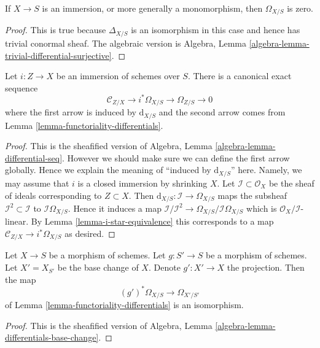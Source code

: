\begin{lemma}
\label{lemma-immersion-differentials}
If $X \to S$ is an immersion, or more generally a monomorphism, then
$\Omega_{X/S}$ is zero.
\end{lemma}

\begin{proof}
This is true because $\Delta_{X/S}$ is an isomorphism in this case
and hence has trivial conormal sheaf. The algebraic version is
Algebra, Lemma \ref{algebra-lemma-trivial-differential-surjective}.
\end{proof}

\begin{lemma}
\label{lemma-differentials-relative-immersion}
Let $i : Z \to X$ be an immersion of schemes over $S$.
There is a canonical exact sequence
$$
\mathcal{C}_{Z/X} \to i^*\Omega_{X/S} \to \Omega_{Z/S} \to 0
$$
where the first arrow is induced by $\text{d}_{X/S}$
and the second arrow comes from Lemma \ref{lemma-functoriality-differentials}.
\end{lemma}

\begin{proof}
This is the sheafified version of
Algebra, Lemma \ref{algebra-lemma-differential-seq}. However
we should make sure we can define the first arrow globally.
Hence we explain the meaning of ``induced by $\text{d}_{X/S}$'' here.
Namely, we may assume that $i$ is a closed immersion by
shrinking $X$. Let $\mathcal{I} \subset \mathcal{O}_X$
be the sheaf of ideals corresponding to $Z \subset X$.
Then $\text{d}_{X/S} : \mathcal{I} \to \Omega_{X/S}$
maps the subsheaf $\mathcal{I}^2 \subset \mathcal{I}$ to
$\mathcal{I}\Omega_{X/S}$. Hence it induces a map
$\mathcal{I}/\mathcal{I}^2 \to \Omega_{X/S}/\mathcal{I}\Omega_{X/S}$
which is $\mathcal{O}_X/\mathcal{I}$-linear.
By Lemma \ref{lemma-i-star-equivalence} this corresponds to a map
$\mathcal{C}_{Z/X} \to i^*\Omega_{X/S}$ as desired.
\end{proof}

\begin{lemma}
\label{lemma-base-change-differentials}
Let $X \to S$ be a morphism of schemes.
Let $g : S' \to S$ be a morphism of schemes.
Let $X' = X_{S'}$ be the base change of $X$.
Denote $g' : X' \to X$ the projection.
Then the map
$$
(g')^*\Omega_{X/S} \to \Omega_{X'/S'}
$$
of Lemma \ref{lemma-functoriality-differentials} is an isomorphism.
\end{lemma}

\begin{proof}
This is the sheafified version of
Algebra, Lemma \ref{algebra-lemma-differentials-base-change}.
\end{proof}

